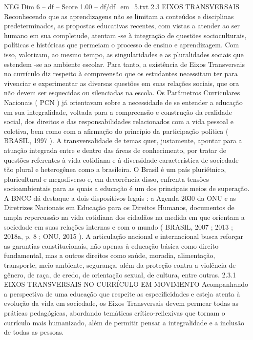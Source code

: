 \begin{textsample}{NEG Dim 6 – df – Score 1.00 – df/df\_em\_5.txt}  \label{ex:f6_neg_169}
2.3 EIXOS TRANSVERSAIS Reconhecendo que as aprendizagens não se limitam a conteúdos e disciplinas predeterminados, as propostas educativas recentes, com vistas a atender ao ser humano em sua completude, atentam -se à integração de questões socioculturais, políticas e históricas que permeiam o processo de ensino e aprendizagem.
Com isso, valorizam, ao mesmo tempo, as singularidades e as pluralidades sociais que estendem -se ao ambiente escolar.
Para tanto, a existência de Eixos Transversais no currículo diz respeito à compreensão que os estudantes necessitam ter para vivenciar e experimentar as diversas questões em suas relações sociais, que ora não devem ser esquecidas ou silenciadas na escola.
Os Parâmetros Curriculares Nacionais ( PCN ) já orientavam sobre a necessidade de se entender a educação em sua integralidade, voltada para a compreensão e construção da realidade social, dos direitos e das responsabilidades relacionados com a vida pessoal e coletiva, bem como com a afirmação do princípio da participação política ( BRASIL, 1997 ).
A transversalidade de temas quer, justamente, apontar para a atuação integrada entre e dentro das áreas de conhecimento, por tratar de questões referentes à vida cotidiana e à diversidade característica de sociedade tão plural e heterogênea como a brasileira.
O Brasil é um país pluriétnico, pluricultural e megadiverso e, em decorrência disso, enfrenta tensões socioambientais para as quais a educação é um dos principais meios de superação.
A BNCC dá destaque a dois dispositivos legais : a Agenda 2030 da ONU e as Diretrizes Nacionais em Educação para os Direitos Humanos, documentos de ampla repercussão na vida cotidiana dos cidadãos na medida em que orientam a sociedade em suas relações internas e com o mundo ( BRASIL, 2007 ; 2013 ; 2018a, p. 8 ; ONU, 2015 ).
A articulação nacional e internacional busca reforçar as garantias constitucionais, não apenas à educação básica como direito fundamental, mas a outros direitos como saúde, moradia, alimentação, transporte, meio ambiente, segurança, além da proteção contra a violência de gênero, de raça, de credo, de orientação sexual, de cultura, entre outras. 2.3.1 EIXOS TRANSVERSAIS NO CURRÍCULO EM MOVIMENTO Acompanhando a perspectiva de uma educação que respeite as especificidades e esteja atenta à evolução da vida em sociedade, os Eixos Transversais devem permear todas as práticas pedagógicas, abordando temáticas crítico-reflexivas que tornam o currículo mais humanizado, além de permitir pensar a integralidade e a inclusão de todas as pessoas.

\end{textsample}
